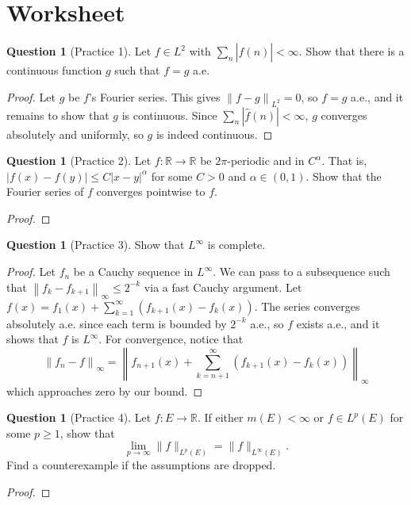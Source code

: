 \documentclass{article}
\newcommand{\norm}[1]{\left\|#1\right\|}
\theoremstyle{definition} %
\numberwithin{thm}{section} %
\theoremstyle{definition} %
\newtheorem{question}[thm]{Question}
\begin{document}
\section{Worksheet}

\begin{question}[Practice 1]
Let $f \in L^2$ with $\sum_n |\hat{f}(n)| < \infty$. Show that there is a continuous function $g$ such that $f = g$ a.e.
\end{question}
\begin{proof}
Let $g$ be $f$'s Fourier series. This gives $\norm{f - g}_{L^2} = 0$, so $f = g$ a.e., and it remains to show that $g$ is continuous. Since $\sum_n |\hat{f}(n)| < \infty$, $g$ converges absolutely and uniformly, so $g$ is indeed continuous.
\end{proof}

\begin{question}[Practice 2]
Let $f : \mathbb{R} \to \mathbb{R}$ be $2\pi$-periodic and in $C^\alpha$. That is, $|f(x) - f(y)| \leq C |x - y|^\alpha$ for some $C > 0$ and $\alpha \in (0, 1)$. Show that the Fourier series of $f$ converges pointwise to $f$.
\end{question}
\begin{proof}

\end{proof}

\begin{question}[Practice 3]
Show that $L^\infty$ is complete.
\end{question}
\begin{proof}
Let $f_n$ be a Cauchy sequence in $L^\infty$. We can pass to a subsequence such that $\norm{f_k - f_{k + 1}}_\infty \leq 2^{-k}$ via a fast Cauchy argument. Let $f(x) = f_1(x) + \sum_{k = 1}^\infty (f_{k + 1}(x) - f_k(x))$. The series converges absolutely a.e. since each term is bounded by $2^{-k}$ a.e., so $f$ exists a.e., and it shows that $f$ is $L^\infty$. For convergence, notice that 
\[ \norm{f_n - f}_\infty = \norm{f_{n + 1}(x) + \sum_{k = n + 1}^\infty (f_{k + 1}(x) - f_k(x))}_\infty \]
which approaches zero by our bound.
\end{proof}

\begin{question}[Practice 4]
Let $f : E \to \mathbb{R}$. If either $m(E) < \infty$ or $f \in L^p(E)$ for some $p \geq 1$, show that
\[
\lim_{p \to \infty} \|f\|_{L^p(E)} = \|f\|_{L^\infty(E)}.
\]
Find a counterexample if the assumptions are dropped.
\end{question}
\begin{proof}

\end{proof}
\end{document}

